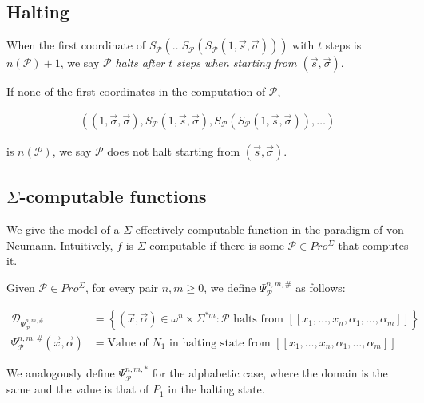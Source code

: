 \documentclass[a4paper, 12pt]{article}
\begin{document}
\subsection{Halting}

When the first coordinate of  $S_{\mathcal{P}} \left( \ldots S_{\mathcal{P}}
\left( S_{\mathcal{P}}\left( 1, \overrightarrow{s}, \overrightarrow{\sigma}
\right)\right)  \right) $ with $t$ steps is $n(\mathcal{P}) + 1$, we say
$\mathcal{P}$ \textit{halts after $t$ steps when starting from
$(\overrightarrow{s}, \overrightarrow{\sigma})$}.

If none of the first coordinates in the computation of $\mathcal{P}$, 

\begin{align*}
    \left(  (1, \overrightarrow{\sigma}, \overrightarrow{\sigma}),
    S_{\mathcal{P}}\left( 1, \overrightarrow{s}, \overrightarrow{\sigma}
\right), S_{\mathcal{P}} \left( S_{\mathcal{P}} \left( 1, \overrightarrow{s},
\overrightarrow{\sigma} \right)  \right), \ldots   \right) 
\end{align*}

is $n(\mathcal{P})$, we say $\mathcal{P}$ does not halt starting from
$(\overrightarrow{s}, \overrightarrow{\sigma})$.

\subsection{$\Sigma$-computable functions}

We give the model of a $\Sigma$-effectively computable function in the paradigm
of von Neumann. Intuitively, $f$ is $\Sigma$-computable if there is some
$\mathcal{P} \in Pro^{\Sigma}$ that computes it. 

Given $\mathcal{P} \in Pro^{\Sigma}$, for every pair $n,m \geq 0$, we define
$\Psi_{\mathcal{P}}^{n, m, \#}$ as follows: 

\begin{align*}
    \mathcal{D}_{\Psi_{\mathcal{P}}^{n, m, \#}} &= \left\{ (\overrightarrow{x},
    \overrightarrow{\alpha}) \in \omega^n \times \Sigma^{*m} : \mathcal{P}
\text{ halts from } [\![ x_1,\ldots, x_n, \alpha_1, \ldots,
\alpha_m ]\!] \right\}  \\ 
        \Psi_{\mathcal{P}}^{n, m, \#}(\overrightarrow{x}, \overrightarrow{\alpha}) &=
    \text{Value of } N_1 \text{ in halting state from } [\![ x_1,\ldots, x_n,
    \alpha_1, \ldots, \alpha_m ]\!]
\end{align*}

We analogously define $\Psi_{\mathcal{P}}^{n, m, *}$ for the alphabetic case,
where the domain is the same and the value is that of $P_1$ in the halting
state.
\end{document}
